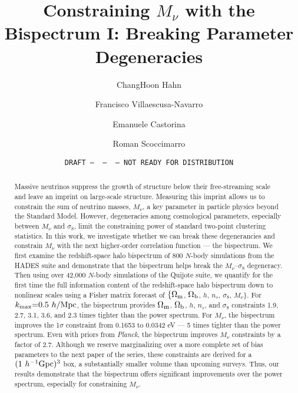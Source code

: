 \documentclass[12pt, letterpaper, preprint]{aastex62}
\newcommand{\Om}{\Omega_{\rm m}}
\newcommand{\Ob}{\Omega_{\rm b}}
\newcommand{\smnu}{M_\nu}
\newcommand{\sig}{\sigma_8}
\newcommand{\mpc}{h/{\rm Mpc}}
\newcommand{\ch}[1]{{\color{dred}{\bf CH:} #1}}
\begin{document}
\sloppy\sloppypar\frenchspacing 

\title{Constraining $\smnu$ with the Bispectrum I: Breaking Parameter Degeneracies} 
\date{\texttt{DRAFT~---~\githash~---~\gitdate~---~NOT READY FOR DISTRIBUTION}}

\author{ChangHoon Hahn}

\author{Francisco Villaescusa-Navarro} 

\author{Emanuele Castorina} 

\author{Roman Scoccimarro} 

\begin{abstract}
    Massive neutrinos suppress the growth of structure below their free-streaming scale and leave an 
    imprint on large-scale structure. Measuring this imprint allows us to constrain the sum of neutrino 
    masses, $\smnu$, a key parameter in particle physics beyond the Standard Model. However, degeneracies 
    among cosmological parameters, especially between $\smnu$ and $\sig$, limit the constraining power 
    of standard two-point clustering statistics. In this work, we investigate whether we can break these 
    degenerancies and constrain $\smnu$ with the next higher-order correlation function --- the bispectrum. 
    We first examine the redshift-space halo bispectrum of $800$ $N$-body simulations from the HADES suite 
    and demonstrate that the bispectrum helps break the $\smnu$--$\sig$ degeneracy. Then using over 42,000
    $N$-body simulations of the Quijote suite, we quantify for the first time the full information content 
    of the redshift-space halo bispectrum down to nonlinear scales using a Fisher matrix forecast of 
    $\{\Om$, $\Ob$, $h$, $n_s$, $\sig$, $\smnu\}$. For $k_{\rm max}{=}0.5~\mpc$, the bispectrum provides 
    $\Om$, $\Ob$, $h$, $n_s$, and $\sig$ constraints \ch{1.9, 2.7, 3.1, 3.6, and 2.3} times tighter than the 
    power spectrum. For $\smnu$, the bispectrum improves the 1$\sigma$ constraint from 
    \ch{0.1653 to 0.0342 eV --- 5 times tighter than the power spectrum}. Even with priors from {\em Planck}, 
    the bispectrum improves $\smnu$ constraints by a factor of 2.7. Although we reserve marginalizing 
    over \ch{a more complete set of} bias parameters to the next paper of the series, these constraints 
    are derived for a $(1~h^{-1}{\rm Gpc})^3$ box, a substantially smaller volume than upcoming surveys. 
    Thus, our results demonstrate that the bispectrum offers significant improvements over the power 
    spectrum, especially for constraining $\smnu$.  
\end{abstract}
\end{document}
